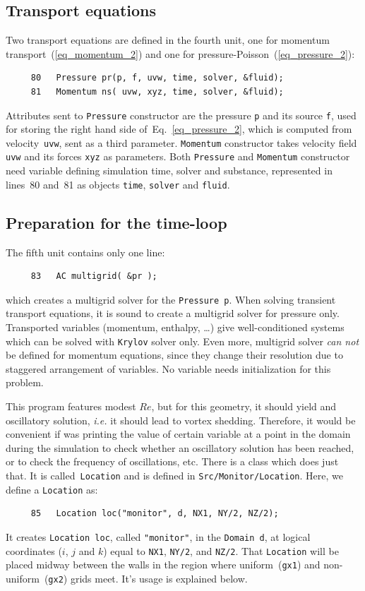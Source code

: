 \subsection{Transport equations}

Two transport equations are defined in the fourth unit, one for momentum
transport~(\ref{eq_momentum_2}) and one for pressure-Poisson~(\ref{eq_pressure_2}):
%
{\small \begin{verbatim}
     80   Pressure pr(p, f, uvw, time, solver, &fluid);
     81   Momentum ns( uvw, xyz, time, solver, &fluid);
\end{verbatim}}
%
Attributes sent to {\tt Pressure} constructor are the pressure {\tt p}
and its source {\tt f}, used for storing the right hand side 
of~Eq.~\ref{eq_pressure_2}, which is computed from velocity~{\tt uvw},
sent as a third parameter. {\tt Momentum} constructor takes velocity
field {\tt uvw} and its forces {\tt xyz} as parameters. Both 
{\tt Pressure} and {\tt Momentum} constructor need variable defining
simulation time, solver and substance, represented in lines~80
and~81 as objects {\tt time}, {\tt solver} and {\tt fluid}.

\subsection{Preparation for the time-loop}

The fifth unit contains only one line:
%
{\small \begin{verbatim}
     83   AC multigrid( &pr );
\end{verbatim}}
%
which creates a multigrid solver for the {\tt Pressure p}. When solving
transient transport equations, it is sound to create a multigrid solver
for pressure only. Transported variables (momentum, enthalpy, \dots)
give well-conditioned systems which can be solved with {\tt Krylov}
solver only. Even more, multigrid solver {\em can not} be defined
for momentum equations, since they change their resolution due to
staggered arrangement of variables. No variable needs initialization for 
this problem.

This program features modest $Re$, but for this geometry, it should yield
and oscillatory solution, {\em i.e.} it should lead to  vortex shedding.
Therefore, it would be convenient if {\psiboil} was printing the value 
of certain variable at a point in the domain during the simulation to check
whether an oscillatory solution has been reached, or to check the frequency
of oscillations, etc. There is a class which does just that. It is 
called~{\tt Location} and is defined in {\tt Src/Monitor/Location}.
Here, we define a {\tt Location} as:
%
{\small \begin{verbatim}
     85   Location loc("monitor", d, NX1, NY/2, NZ/2);
\end{verbatim}}
%
It creates {\tt Location loc}, called {\tt "monitor"}, in the {\tt Domain d},
at logical coordinates ($i$, $j$ and $k$) equal to {\tt NX1}, {\tt NY/2}, 
and {\tt NZ/2}. That {\tt Location} will be placed midway between the walls
in the region where uniform~({\tt gx1}) and non-uniform~({\tt gx2}) grids
meet. It's usage is explained below. 

